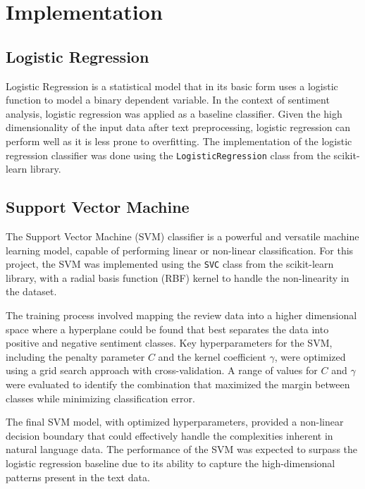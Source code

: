 \documentclass[conference]{IEEEtran}
\begin{document}
	\section{Implementation}
	
	\subsection{Logistic Regression}
	
	Logistic Regression is a statistical model that in its basic form uses a logistic function to model a binary dependent variable. In the context of sentiment analysis, logistic regression was applied as a baseline classifier. Given the high dimensionality of the input data after text preprocessing, logistic regression can perform well as it is less prone to overfitting. The implementation of the logistic regression classifier was done using the \texttt{LogisticRegression} class from the scikit-learn library.
	
	\subsection{Support Vector Machine}
	
	The Support Vector Machine (SVM) classifier is a powerful and versatile machine learning model, capable of performing linear or non-linear classification. For this project, the SVM was implemented using the \texttt{SVC} class from the scikit-learn library, with a radial basis function (RBF) kernel to handle the non-linearity in the dataset.
	
	The training process involved mapping the review data into a higher dimensional space where a hyperplane could be found that best separates the data into positive and negative sentiment classes. Key hyperparameters for the SVM, including the penalty parameter $C$ and the kernel coefficient $\gamma$, were optimized using a grid search approach with cross-validation. A range of values for $C$ and $\gamma$ were evaluated to identify the combination that maximized the margin between classes while minimizing classification error.
	
	The final SVM model, with optimized hyperparameters, provided a non-linear decision boundary that could effectively handle the complexities inherent in natural language data. The performance of the SVM was expected to surpass the logistic regression baseline due to its ability to capture the high-dimensional patterns present in the text data.
	
\end{document}
